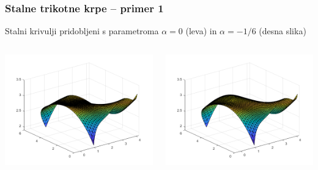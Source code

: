 \documentclass{beamer}
\begin{document}
\begin{frame}
    \frametitle{Stalne trikotne krpe -- primer 1}
    Stalni krivulji pridobljeni s parametroma $\alpha = 0$ (leva) in $\alpha = -1/6$ (desna slika)
    \begin{columns}[c]
		\begin{column}{0.5\textwidth}
			\includegraphics[width=1.2\textwidth]{trikotne_0.png}
		\end{column}
		\begin{column}{0.5\textwidth}
			\includegraphics[width=1.2\textwidth]{trikotne_1_6.png}
		\end{column}
	\end{columns}
\end{frame}
\end{document}

